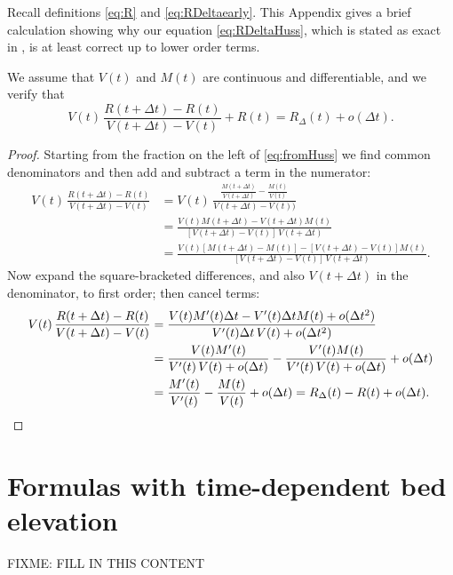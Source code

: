 \documentclass[11pt]{amsart}
\theoremstyle{definition}
\begin{document}
Recall definitions \eqref{eq:R} and \eqref{eq:RDeltaearly}.  This Appendix gives a brief calculation showing why our equation \eqref{eq:RDeltaHuss}, which is stated as exact in \cite{Huss2013}, is at least correct up to lower order terms.

We assume that $V(t)$ and $M(t)$ are continuous and differentiable, and we verify that
\begin{equation}
V(t)\, \frac{R(t+\Delta t) - R(t)}{V(t+\Delta t) - V(t)} + R(t) = R_{\Delta}(t) + o(\Delta t).  \label{eq:fromHuss}
\end{equation}

\begin{proof}  Starting from the fraction on the left of \eqref{eq:fromHuss} we find common denominators and then add and subtract a term in the numerator:  
\begin{align*}
V(t)\, \frac{R(t+\Delta t) - R(t)}{V(t+\Delta t) - V(t)} &= V(t)\, \frac{\frac{M(t+\Delta t)}{V(t+\Delta t)} - \frac{M(t)}{V(t)}}{V(t+\Delta t) - V(t))} \\
    &= \frac{V(t) M(t+\Delta t) - V(t+\Delta t) M(t)}{\left[V(t+\Delta t) - V(t)\right] \, V(t+\Delta t)} \\
    &= \frac{V(t) \left[M(t+\Delta t)-M(t)\right] - \left[V(t+\Delta t) - V(t)\right] M(t)}{\left[V(t+\Delta t) - V(t)\right] \, V(t+\Delta t)}.
\end{align*}
Now expand the square-bracketed differences, and also $V(t+\Delta t)$ in the denominator, to first order; then cancel terms:
\begin{align*}
V(t)\, \frac{R(t+\Delta t) - R(t)}{V(t+\Delta t) - V(t)} &= \frac{V(t) M'(t)\Delta t - V'(t)\Delta t M(t) + o(\Delta t^2)}{V'(t) \Delta t \, V(t) + o(\Delta t^2)} \\
    &= \frac{V(t) M'(t)}{V'(t) \, V(t) + o(\Delta t)} - \frac{V'(t) M(t)}{V'(t) \, V(t) + o(\Delta t)}  + o(\Delta t)\\
    &= \frac{M'(t)}{V'(t)} - \frac{M(t)}{V(t)}  + o(\Delta t) = R_{\Delta}(t) - R(t) + o(\Delta t). \qedhere
\end{align*}
\end{proof}


\section{Formulas with time-dependent bed elevation}  \label{app:general}

FIXME: FILL IN THIS CONTENT
\end{document}
